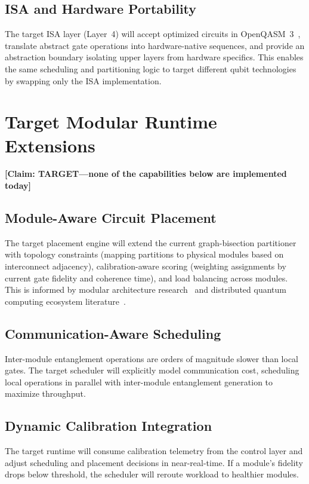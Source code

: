 \documentclass[conference]{IEEEtran}
\begin{document}
\subsection{ISA and Hardware Portability}

The target ISA layer (Layer~4) will accept optimized circuits in OpenQASM~3~\cite{Cross2022}, translate abstract gate operations into hardware-native sequences, and provide an abstraction boundary isolating upper layers from hardware specifics. This enables the same scheduling and partitioning logic to target different qubit technologies by swapping only the ISA implementation.

\section{Target Modular Runtime Extensions}

\textbf{[Claim: TARGET---none of the capabilities below are implemented today]}

\subsection{Module-Aware Circuit Placement}

The target placement engine will extend the current graph-bisection partitioner with topology constraints (mapping partitions to physical modules based on interconnect adjacency), calibration-aware scoring (weighting assignments by current gate fidelity and coherence time), and load balancing across modules. This is informed by modular architecture research~\cite{Monroe2014} and distributed quantum computing ecosystem literature~\cite{Cuomo2020}.

\subsection{Communication-Aware Scheduling}

Inter-module entanglement operations are orders of magnitude slower than local gates. The target scheduler will explicitly model communication cost, scheduling local operations in parallel with inter-module entanglement generation to maximize throughput.

\subsection{Dynamic Calibration Integration}

The target runtime will consume calibration telemetry from the control layer and adjust scheduling and placement decisions in near-real-time. If a module's fidelity drops below threshold, the scheduler will reroute workload to healthier modules.
\end{document}
